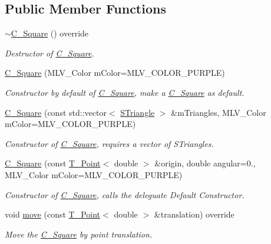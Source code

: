 \subsection*{Public Member Functions}
\begin{DoxyCompactItemize}
\item 
\mbox{\label{classSquare_ab0677a46d02aa78bc0b7be8c06f9dc37}} 
\hyperlink{classSquare_ab0677a46d02aa78bc0b7be8c06f9dc37}{$\sim$\+C_Square} () override
\begin{DoxyCompactList}\small\item\em Destructor of \hyperlink{classSquare}{C_Square}. \end{DoxyCompactList}\item
\hyperlink{classSquare_a6451bb12ac23987428f1a92bf15326b1}{C_Square} (M\+L\+V\+\_\+\+Color mColor=M\+L\+V\+\_\+\+C\+O\+L\+O\+R\+\_\+\+P\+U\+R\+P\+LE)
\begin{DoxyCompactList}\small\item\em Constructor by default of \hyperlink{classSquare}{C_Square}, make a \hyperlink{classSquare}{C_Square} as default. \end{DoxyCompactList}\item
\hyperlink{classSquare_ae96b331f8e15352149dbf9ee10ef7cfd}{C_Square} (const std\+::vector$<$ \hyperlink{classSTriangle}{S\+Triangle} $>$ \&mTriangles, M\+L\+V\+\_\+\+Color mColor=M\+L\+V\+\_\+\+C\+O\+L\+O\+R\+\_\+\+P\+U\+R\+P\+LE)
\begin{DoxyCompactList}\small\item\em Constructor of \hyperlink{classSquare}{C_Square}, requires a vector of S\+Triangles. \end{DoxyCompactList}\item
\hyperlink{classSquare_aff298af518965b650d52b6366de7f3bb}{C_Square} (const \hyperlink{classPoint}{T_Point}$<$ double $>$ \&origin, double angular=0., M\+L\+V\+\_\+\+Color mColor=M\+L\+V\+\_\+\+C\+O\+L\+O\+R\+\_\+\+P\+U\+R\+P\+LE)
\begin{DoxyCompactList}\small\item\em Constructor of \hyperlink{classSquare}{C_Square}, calls the deleguate Default Constructor. \end{DoxyCompactList}\item
void \hyperlink{classSquare_a75b2fd22fc3895b83bc20728afb20b10}{move} (const \hyperlink{classPoint}{T_Point}$<$ double $>$ \&translation) override
\begin{DoxyCompactList}\small\item\em Move the \hyperlink{classSquare}{C_Square} by point translation. \end{DoxyCompactList}\item

\end{DoxyCompactItemize}
